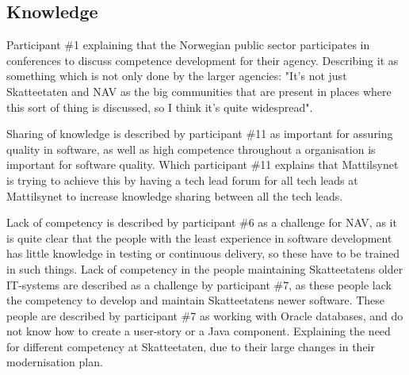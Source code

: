 \subsection{Knowledge}
Participant \#1 explaining that the Norwegian public sector participates in conferences to discuss competence development for their agency. Describing it as something which is not only done by the larger agencies: "It's not just Skatteetaten and NAV as the big communities that are present in places where this sort of thing is discussed, so I think it's quite widespread".


Sharing of knowledge is described by participant \#11 as important for assuring quality in software, as well as high competence throughout a organisation is important for software quality. Which participant \#11 explains that Mattilsynet is trying to achieve this by having a tech lead forum for all tech leads at Mattilsynet to increase knowledge sharing between all the tech leads.


Lack of competency is described by participant \#6 as a challenge for NAV, as it is quite clear that the people with the least experience in software development has little knowledge in testing or continuous delivery, so these have to be trained in such things. Lack of competency in the people maintaining Skatteetatens older IT-systems are described as a challenge by participant \#7, as these people lack the competency to develop and maintain Skatteetatens newer software. These people are described by participant \#7 as working with Oracle databases, and do not know how to create a user-story or a Java component. Explaining the need for different competency at Skatteetaten, due to their large changes in their modernisation plan.



